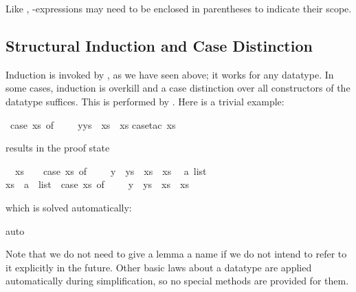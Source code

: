 \begin{isabellebody}
\begin{isamarkuptext}
\begin{warn}
Like , -expressions may need to be enclosed in
parentheses to indicate their scope.
\end{warn}

\subsection{Structural Induction and Case Distinction}
\label{sec:struct-ind-case}
%
Induction is invoked by , as we have seen above; 
it works for any datatype.  In some cases, induction is overkill and a case
distinction over all constructors of the datatype suffices.  This is performed
by .  Here is a trivial example:%
\end{isamarkuptext}%
\isamarkuptrue%
\isamarkupfalse%
\ {\isachardoublequoteopen}{\isacharparenleft}case\ xs\ of\ {\isacharbrackleft}{\isacharbrackright}\ {\isasymRightarrow}\ {\isacharbrackleft}{\isacharbrackright}\ {\isacharbar}\ y{\isacharhash}ys\ {\isasymRightarrow}\ xs{\isacharparenright}\ {\isacharequal}\ xs{\isachardoublequoteclose}\isanewline
%
\isadelimproof
%
\endisadelimproof
%
\isatagproof
{}\isamarkupfalse%
{\isacharparenleft}case{\isacharunderscore}tac\ xs{\isacharparenright}%
\begin{isamarkuptxt}%
\noindent
results in the proof state
\begin{isabelle}%
\ {}{\isachardot}\ xs\ {\isacharequal}\ {\isacharbrackleft}{\isacharbrackright}\ {\isasymLongrightarrow}\ {\isacharparenleft}case\ xs\ of\ {\isacharbrackleft}{\isacharbrackright}\ {\isasymRightarrow}\ {\isacharbrackleft}{\isacharbrackright}\ {\isacharbar}\ y\ {\isacharhash}\ ys\ {\isasymRightarrow}\ xs{\isacharparenright}\ {\isacharequal}\ xs\isanewline
\ {}{\isachardot}\ {\isasymAnd}a\ list{\isachardot}\isanewline
{}xs\ {\isacharequal}\ a\ {\isacharhash}\ list\ {\isasymLongrightarrow}\ {\isacharparenleft}case\ xs\ of\ {\isacharbrackleft}{\isacharbrackright}\ {\isasymRightarrow}\ {\isacharbrackleft}{\isacharbrackright}\ {\isacharbar}\ y\ {\isacharhash}\ ys\ {\isasymRightarrow}\ xs{\isacharparenright}\ {\isacharequal}\ xs%
\end{isabelle}
which is solved automatically:%
\end{isamarkuptxt}%
\isamarkuptrue%
\isamarkupfalse%
{\isacharparenleft}auto{\isacharparenright}%
\endisatagproof
{\isafoldproof}%
%
\isadelimproof
%
\endisadelimproof
%
\begin{isamarkuptext}%
Note that we do not need to give a lemma a name if we do not intend to refer
to it explicitly in the future.
Other basic laws about a datatype are applied automatically during
simplification, so no special methods are provided for them.


\end{isamarkuptext}
\end{isabellebody}
